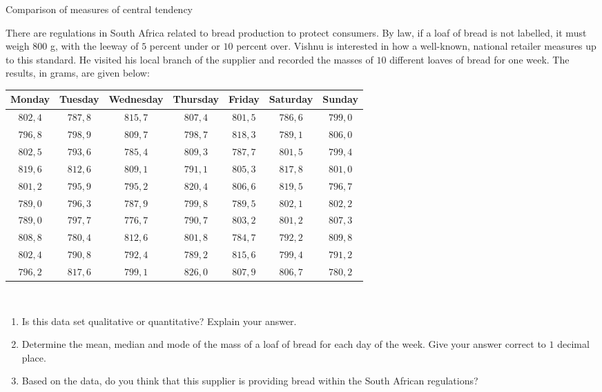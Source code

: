 \begin{wex}{Comparison of measures of central tendency}{
    There are regulations in South Africa related to bread production
    to protect consumers. By law, if a loaf of bread is not labelled,
    it must weigh $800$ g, with the leeway of $5$ percent under or $10$
    percent over.  Vishnu is interested in how a well-known, national
    retailer measures up to this standard. He visited his local branch
    of the supplier and recorded the masses of $10$ different loaves
    of bread for one week. The results, in grams, are given below:\\

    \begin{center}
      \begin{tabular}{|c|c|c|c|c|c|c|} \hline
       
        \textbf{Monday} & \textbf{Tuesday} & \textbf{Wednesday} & \textbf{Thursday} & \textbf{Friday} & \textbf{Saturday} & \textbf{Sunday} \\ \hline
        
        $802,4$ & $787,8$ & $815,7$ & $807,4$ & $801,5$ & $786,6$ & $799,0$ \\ \hline
        $796,8$ & $798,9$ & $809,7$ & $798,7$ & $818,3$ & $789,1$ & $806,0$ \\ \hline
        $802,5$ & $793,6$ & $785,4$ & $809,3$ & $787,7$ & $801,5$ & $799,4$ \\ \hline
        $819,6$ & $812,6$ & $809,1$ & $791,1$ & $805,3$ & $817,8$ & $801,0$ \\ \hline
        $801,2$ & $795,9$ & $795,2$ & $820,4$ & $806,6$ & $819,5$ & $796,7$ \\ \hline
        $789,0$ & $796,3$ & $787,9$ & $799,8$ & $789,5$ & $802,1$ & $802,2$ \\ \hline
        $789,0$ & $797,7$ & $776,7$ & $790,7$ & $803,2$ & $801,2$ & $807,3$ \\ \hline
        $808,8$ & $780,4$ & $812,6$ & $801,8$ & $784,7$ & $792,2$ & $809,8$ \\ \hline
        $802,4$ & $790,8$ & $792,4$ & $789,2$ & $815,6$ & $799,4$ & $791,2$ \\ \hline
        $796,2$ & $817,6$ & $799,1$ & $826,0$ & $807,9$ & $806,7$ & $780,2$ \\ \hline
       
      \end{tabular}
    \end{center}
\vspace{8pt}\\
    \begin{enumerate}[noitemsep, label=\textbf{\arabic*}.]
    \item Is this data set qualitative or quantitative? Explain your
      answer.
    \item Determine the mean, median and mode of the mass of a loaf of bread
      for each day of the week. Give your answer correct to $1$ decimal place.
    \item Based on the data, do you think that this supplier is
      providing bread within the South African regulations?
    \end{enumerate}
}{

}
\end{wex}
